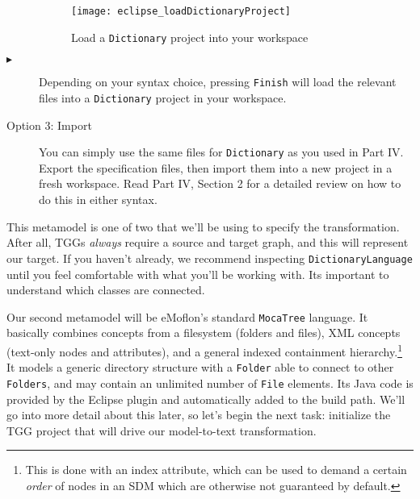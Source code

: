 \begin{description}
\vspace{0.5cm}

\begin{figure}[htbp]
\begin{center}
  \texttt{[image: eclipse\_loadDictionaryProject]}
  \caption{Load a \texttt{Dictionary} project into your workspace}
  \label{eclipse_cheatPackage}
\end{center}
\end{figure}

\item[$\blacktriangleright$] Depending on your syntax choice, pressing \texttt{Finish} will load the relevant files into a 
\texttt{Dictionary} project in your workspace.

\vspace{2cm}

\item[Option 3: Import] You can simply use the same files for \texttt{Dictionary} as you used in Part IV. Export the specification files, then import them
into a new project in a fresh workspace. Read Part IV, Section 2 for a detailed review on how to do this in either syntax.

\end{description} 

\newpage

This metamodel is one of two that we'll be using to specify the transformation. After all, TGGs \emph{always} require a source and target graph, and this will
represent our target. If you haven't already, we recommend inspecting \texttt{DictionaryLanguage} until you feel comfortable with what you'll be working with.
Its important to understand which classes are connected.

Our second metamodel will be eMoflon's standard \texttt{MocaTree} language. It basically combines concepts from a filesystem (folders and files), XML concepts
(text-only nodes and attributes), and a general indexed containment hierarchy.\footnote{This is done with an index attribute, which can be used to demand a
certain \emph{order} of nodes in an SDM which are otherwise not guaranteed by default.} It models a generic directory structure with a \texttt{Folder} able to
connect to other \texttt{Folders}, and may contain an unlimited number of \texttt{File} elements. Its Java code is provided by the Eclipse plugin and
automatically added to the build path.  We'll go into more detail about this later, so let's begin the next task: initialize the TGG project that will drive our
model-to-text transformation.







